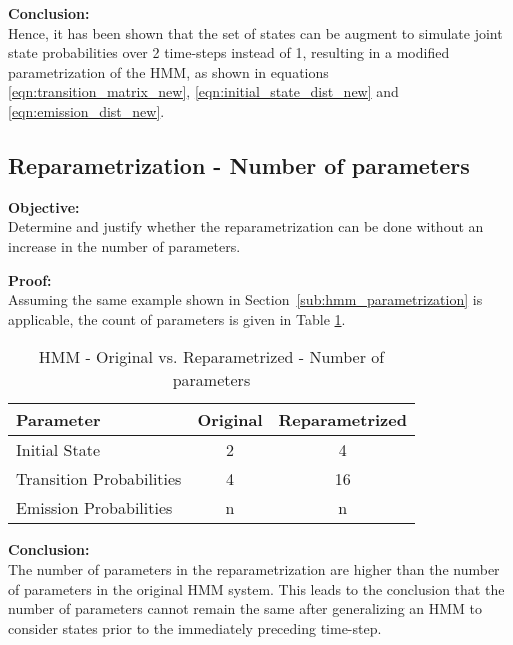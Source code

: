 \documentclass[parskip=half]{scrartcl}
\begin{document}
        \textbf{Conclusion:}\\
        Hence, it has been shown that the set of states can be augment to simulate joint state probabilities over 2 time-steps instead of 1, resulting in a modified parametrization of the HMM, as shown in equations \ref{eqn:transition_matrix_new}, \ref{eqn:initial_state_dist_new} and \ref{eqn:emission_dist_new}.
    


    \subsection{Reparametrization - Number of parameters} %
    \label{sub:reparametrization_number_of_parameters}

        \textbf{Objective:}\\
        Determine and justify whether the reparametrization can be done without an increase in the number of parameters.

        \textbf{Proof:}\\
        Assuming the same example shown in Section~\ref{sub:hmm_parametrization} is applicable, the count of parameters is given in Table \ref{tab:hmm-original-vs-reparametrized}.
        \begin{table}[th]
            \centering
            \begin{tabular}{| l | c | c |}
            \hline
            \textbf{Parameter} & \textbf{Original} & \textbf{Reparametrized} \\
            \hline
            \hline
                Initial State & 2 & 4 \\
            \hline
                Transition Probabilities & 4 & 16 \\
            \hline
                Emission Probabilities & n & n \\
            \hline
            \end{tabular}
            \caption{HMM - Original vs. Reparametrized - Number of parameters}
            \label{tab:hmm-original-vs-reparametrized}
        \end{table}

        \textbf{Conclusion:}\\
        The number of parameters in the reparametrization are higher than the number of parameters in the original HMM system. This leads to the conclusion that the number of parameters cannot remain the same after generalizing an HMM to consider states prior to the immediately preceding time-step.
    
\end{document}
